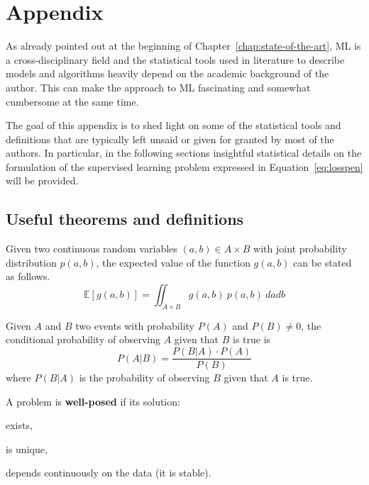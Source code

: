 \appendix

\chapter{Appendix} \label{appendix:A}
As already pointed out at the beginning of Chapter~\ref{chap:state-of-the-art}, ML is a cross-disciplinary field and the statistical tools used in literature to describe models and algorithms heavily depend on the academic background of the author. This can make the approach to ML fascinating and somewhat cumbersome at the same time.

The goal of this appendix is to shed light on some of the statistical tools and definitions that are typically left unsaid or given for granted by most of the authors. In particular, in the following sections insightful statistical details on the formulation of the supervised learning problem expressed in Equation~\eqref{eq:losspen} will be provided.


\section{Useful theorems and definitions}

\begin{theorem} \label{th:lotus}
	Given two continuous random variables $(a,b) \in A \times B$ with joint probability distribution $p(a,b)$, the expected value of the function $g(a,b)$ can be stated as follows.
	$$\mathbb{E}[g(a,b)]=\iint_{A \times B}g(a,b)~p(a,b)~dadb$$
\end{theorem}

\begin{theorem} \label{th:bayes_rule}
	Given $A$ and $B$ two events with probability $P(A)$ and $P(B) \neq 0$, the conditional probability of observing $A$ given that $B$ is true is
	$$P(A|B) = \frac{P(B|A) \cdot P(A)}{P(B)}$$
	where $P(B|A)$ is the probability of observing $B$ given that $A$ is true.
\end{theorem}

\begin{definition}
	A problem is \textbf{well-posed} if its solution:
	\begin{enumerate*}[label=(\roman*)]
		\item exists,
		\item is unique,
		\item depends continuously on the data (\eg it is stable).
	\end{enumerate*}
\end{definition}

